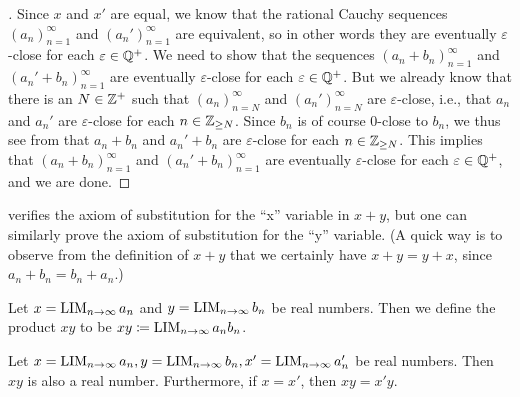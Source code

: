 \begin{proof}[]
  Since \(x\) and \(x'\) are equal, we know that the rational Cauchy sequences \((a_n)_{n = 1}^{\infty}\) and \((a_n')_{n = 1}^{\infty}\) are equivalent, so in other words they are eventually \(\varepsilon\)-close for each \(\varepsilon \in \mathbb{Q}^+\).
  We need to show that the sequences \((a_n + b_n)_{n = 1}^{\infty}\) and \((a_n' + b_n)_{n = 1}^{\infty}\) are eventually \(\varepsilon\)-close for each \(\varepsilon \in \mathbb{Q}^+\).
  But we already know that there is an \(N \in \mathbb{Z}^+\) such that \((a_n)_{n = N}^{\infty}\) and \((a_n')_{n = N}^{\infty}\) are \(\varepsilon\)-close, i.e., that \(a_n\) and \(a_n'\) are \(\varepsilon\)-close for each \(n \in \mathbb{Z}_{\geq N}\).
  Since \(b_n\) is of course \(0\)-close to \(b_n\), we thus see from  that \(a_n + b_n\) and \(a_n' + b_n\) are \(\varepsilon\)-close for each \(n \in \mathbb{Z}_{\geq N}\).
  This implies that \((a_n + b_n)_{n = 1}^{\infty}\) and \((a_n' + b_n)_{n = 1}^{\infty}\) are eventually \(\varepsilon\)-close for each \(\varepsilon \in \mathbb{Q}^+\), and we are done.
\end{proof}

\begin{rmk}\label{i:5.3.8}
   verifies the axiom of substitution for the ``x'' variable in \(x + y\), but one can similarly prove the axiom of substitution for the ``y'' variable.
  (A quick way is to observe from the definition of \(x + y\) that we certainly have \(x + y = y + x\), since \(a_n + b_n = b_n + a_n\).)
\end{rmk}

\begin{defn}\label{i:5.3.9}
  Let \(x = \operatorname*{LIM}_{n \to \infty} a_n\) and \(y = \operatorname*{LIM}_{n \to \infty} b_n\) be real numbers.
  Then we define the product \(xy\) to be \(xy \coloneqq \operatorname*{LIM}_{n \to \infty} a_n b_n\).
\end{defn}

\begin{prop}\label{i:5.3.10}
  Let \(x = \operatorname*{LIM}_{n \to \infty} a_n, y = \operatorname*{LIM}_{n \to \infty} b_n, x' = \operatorname*{LIM}_{n \to \infty} a_n'\) be real numbers.
  Then \(xy\) is also a real number.
  Furthermore, if \(x = x'\), then \(xy = x'y\).
\end{prop}

